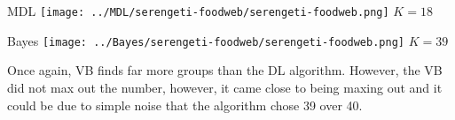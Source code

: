 \begin{minipage}{0.45\linewidth}
MDL
\centering
\texttt{[image: ../MDL/serengeti-foodweb/serengeti-foodweb.png]}
$K=18$

\end{minipage}
\begin{minipage}{0.45\linewidth}
Bayes
\centering
\texttt{[image: ../Bayes/serengeti-foodweb/serengeti-foodweb.png]}
$K=39$
\end{minipage}
\vspace{10pt}

Once again, VB finds far more groups than the DL algorithm. However, the VB
did not max out the number, however, it came close to being maxing out and
it could be due to simple noise that the algorithm chose 39 over 40.
